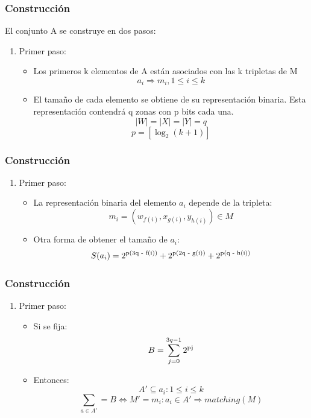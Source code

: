 \documentclass{beamer}
\begin{document}

\begin{frame}
\frametitle{Construcci\'on}
El conjunto A se construye en dos pasos:
\begin{enumerate}
\item Primer paso:
\begin{itemize}
\item Los primeros k elementos de A est\'an asociados con las k tripletas de M
$$ a_{i} \Rightarrow m_{i}, 1 \leq i \leq k $$
\item El tama\~{n}o de cada elemento se obtiene de su representaci\'on binaria.
Esta representaci\'on contendr\'a q zonas con p bits cada una.
$$ |W| = |X| = |Y| = q $$
$$p = [\log_2(k + 1)]$$
\end{itemize}

\end{enumerate}

\end{frame}


\begin{frame}
\frametitle{Construcci\'on}
\begin{enumerate}
\item Primer paso:
\begin{itemize}
\item La representaci\'on binaria del elemento $a_{i}$ depende de la tripleta:
$$m_{i} = (w_{f(i)}, x_{g(i)}, y_{h(i)}) \in M$$
\item Otra forma de obtener el tama\~{n}o de $a_{i}$:
$$S(a_{i}) = 2\textsuperscript{p(3q - f(i))} + 2\textsuperscript{p(2q - g(i))} + 2\textsuperscript{p(q - h(i))}$$
\end{itemize}

\end{enumerate}

\end{frame}


\begin{frame}
\frametitle{Construcci\'on}
\begin{enumerate}
\item Primer paso:
\begin{itemize}
\item Si se fija:
$$B = \sum\limits_{j=0}^{3q -1} 2\textsuperscript{pj}$$
\item Entonces:
$$A'\subseteq {a_{i}: 1 \leq i \leq k}$$
$$\sum\limits_{a\in A'} = B \iff M' = {m_{i}: a_{i} \in A' \Rightarrow matching(M)}$$
\end{itemize}

\end{enumerate}

\end{frame}
\end{document}
